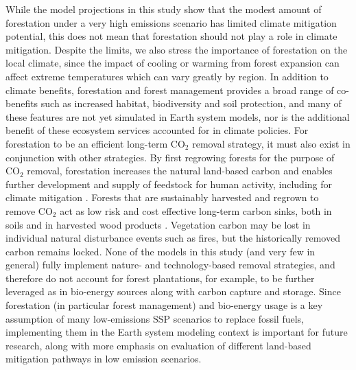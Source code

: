\documentclass[draft]{agujournal2019}
\begin{document}
While the model projections in this study show that the modest amount of forestation under a very high emissions scenario has limited climate mitigation potential, this does not mean that forestation should not play a role in climate mitigation.
Despite the limits, we also stress the importance of forestation on the local climate, since the impact of cooling or warming from forest expansion can affect extreme temperatures which can vary greatly by region.
In addition to climate benefits, forestation and forest management provides a broad range of co-benefits such as increased habitat, biodiversity and soil protection, and many of these features are not yet simulated in Earth system models, nor is the additional benefit of these ecosystem services accounted for in climate policies.
For forestation to be an efficient long-term CO$_2$ removal strategy, it must also exist in conjunction with other strategies.
By first regrowing forests for the purpose of CO$_2$ removal, forestation increases the natural land-based carbon and enables further development and supply of feedstock for human activity, including for climate mitigation \cite{geng_review_2017}.
Forests that are sustainably harvested and regrown to remove CO$_2$ act as low risk and cost effective long-term carbon sinks, both in soils and in harvested wood products \cite{schulze_climate_2020,soimakallio_trade-offs_2021}.
Vegetation carbon may be lost in individual natural disturbance events such as fires, but the historically removed carbon remains locked.
None of the models in this study (and very few in general) fully implement nature- and technology-based removal strategies, and therefore do not account for forest plantations, for example, to be further leveraged as in bio-energy sources along with carbon capture and storage.
Since forestation (in particular forest management) and bio-energy usage is a key assumption of many low-emissions SSP scenarios to replace fossil fuels, implementing them in the Earth system modeling context is important for future research, along with more emphasis on evaluation of different land-based mitigation pathways in low emission scenarios.


%
%
%
%
\end{document}
